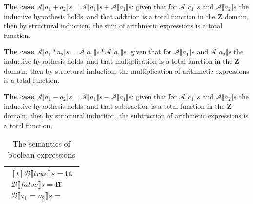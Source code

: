 \documentclass{article}
\begin{document}
\noindent \textbf{The case} $\mathcal{A}\llbracket a_1 + a_2 \rrbracket s = \mathcal{A}\llbracket a_1 \rrbracket s + \mathcal{A}\llbracket a_1 \rrbracket s$:
given that for $\mathcal{A}\llbracket a_1 \rrbracket s$ and $\mathcal{A}\llbracket a_2 \rrbracket s$ the inductive hypothesis holds, and that addition is a total function in the \textbf{Z} domain, then by structural induction, the sum of arithmetic expressions is a total function.

\noindent \textbf{The case} $\mathcal{A}\llbracket a_1 * a_2 \rrbracket s = \mathcal{A}\llbracket a_1 \rrbracket s * \mathcal{A}\llbracket a_1 \rrbracket s$:
given that for $\mathcal{A}\llbracket a_1 \rrbracket s$ and $\mathcal{A}\llbracket a_2 \rrbracket s$ the inductive hypothesis holds, and that multiplication is a total function in the \textbf{Z} domain, then by structural induction, the multiplication of arithmetic expressions is a total function.

\noindent \textbf{The case} $\mathcal{A}\llbracket a_1 - a_2 \rrbracket s = \mathcal{A}\llbracket a_1 \rrbracket s - \mathcal{A}\llbracket a_1 \rrbracket s$:
given that for $\mathcal{A}\llbracket a_1 \rrbracket s$ and $\mathcal{A}\llbracket a_2 \rrbracket s$ the inductive hypothesis holds, and that subtraction is a total function in the \textbf{Z} domain, then by structural induction, the subtraction of arithmetic expressions is a total function.


\begin{table}[ht!]
 \centering
     \setlength{\tabcolsep}{1em} %
    \begin{tabular}{|p{\textwidth}|}
    \hline
    $\begin{aligned}[t] %
    \mathcal{B}\llbracket true \rrbracket s = \textbf{tt} \\
    \mathcal{B}\llbracket false \rrbracket s = \textbf{ff} \\
    \mathcal{B}\llbracket a_1 = a_2 \rrbracket s =
    \end{aligned}$ \\
    \hline
    \end{tabular}
    \caption{The semantics of boolean expressions}
\end{table}
\end{document}
